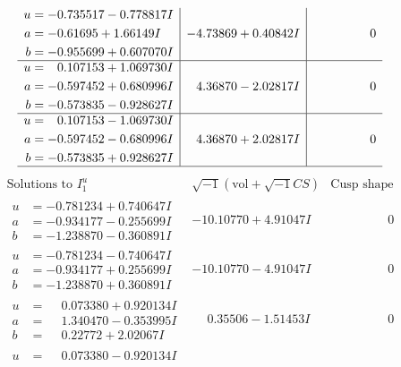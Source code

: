 \documentclass[1p]{elsarticle_modified}
\theoremstyle{definition}
\newcommand{\I}{\sqrt{-1}}
\begin{document}
$$\begin{array}{c|c|c}
\begin{aligned}
u &= -0.735517 - 0.778817 I \\
a &= -0.61695 + 1.66149 I \\
b &= -0.955699 + 0.607070 I\end{aligned}
 & -4.73869 + 0.40842 I & \phantom{-0.000000 } 0 \\ \hline\begin{aligned}
u &= \phantom{-}0.107153 + 1.069730 I \\
a &= -0.597452 + 0.680996 I \\
b &= -0.573835 - 0.928627 I\end{aligned}
 & \phantom{-}4.36870 - 2.02817 I & \phantom{-0.000000 } 0 \\ \hline\begin{aligned}
u &= \phantom{-}0.107153 - 1.069730 I \\
a &= -0.597452 - 0.680996 I \\
b &= -0.573835 + 0.928627 I\end{aligned}
 & \phantom{-}4.36870 + 2.02817 I & \phantom{-0.000000 } 0\\
 \hline 
 \end{array}$$\newpage$$\begin{array}{c|c|c}  
\text{Solutions to }I^u_{1}& \I (\text{vol} + \sqrt{-1}CS) & \text{Cusp shape}\\
 \hline 
\begin{aligned}
u &= -0.781234 + 0.740647 I \\
a &= -0.934177 - 0.255699 I \\
b &= -1.238870 - 0.360891 I\end{aligned}
 & -10.10770 + 4.91047 I & \phantom{-0.000000 } 0 \\ \hline\begin{aligned}
u &= -0.781234 - 0.740647 I \\
a &= -0.934177 + 0.255699 I \\
b &= -1.238870 + 0.360891 I\end{aligned}
 & -10.10770 - 4.91047 I & \phantom{-0.000000 } 0 \\ \hline\begin{aligned}
u &= \phantom{-}0.073380 + 0.920134 I \\
a &= \phantom{-}1.340470 - 0.353995 I \\
b &= \phantom{-}0.22772 + 2.02067 I\end{aligned}
 & \phantom{-}0.35506 - 1.51453 I & \phantom{-0.000000 } 0 \\ \hline\begin{aligned}
u &= \phantom{-}0.073380 - 0.920134 I \\

\end{aligned}
\end{array}$$
\end{document}
